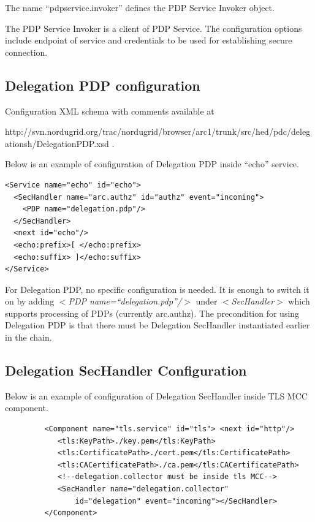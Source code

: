 \documentclass{article}                            %
\begin{document}
The name ``pdpservice.invoker'' defines the PDP Service Invoker object.

The PDP Service Invoker is a client of PDP Service. The configuration options include endpoint of service and credentials to be used for establishing secure connection.


\subsection{Delegation PDP configuration} %
\label{subsec:delegpdp_conf}
Configuration XML schema with comments available at 

http://svn.nordugrid.org/trac/nordugrid/browser/arc1/trunk/src/hed/pdc/delegationsh/DelegationPDP.xsd .

Below is an example of configuration of Delegation PDP inside ``echo'' service.

\begin{verbatim}
<Service name="echo" id="echo">
  <SecHandler name="arc.authz" id="authz" event="incoming">
    <PDP name="delegation.pdp"/>
  </SecHandler>
  <next id="echo"/>
  <echo:prefix>[ </echo:prefix>
  <echo:suffix> ]</echo:suffix>
</Service>
\end{verbatim}

For Delegation PDP, no specific configuration is needed. It is enough to switch it on by adding \textit{$<$PDP name=``delegation.pdp''/$>$} under \textit{$<$SecHandler$>$} which supports processing of PDPs (currently arc.authz).
The precondition for using Delegation PDP is that there must be Delegation SecHandler instantiated earlier in the chain.


\subsection{Delegation SecHandler Configuration} %
\label{subsec:deleg_sechandler_conf}
Below is an example of configuration of Delegation SecHandler inside TLS MCC component.

\begin{verbatim}
         <Component name="tls.service" id="tls"> <next id="http"/>
            <tls:KeyPath>./key.pem</tls:KeyPath>
            <tls:CertificatePath>./cert.pem</tls:CertificatePath>
            <tls:CACertificatePath>./ca.pem</tls:CACertificatePath>
            <!--delegation.collector must be inside tls MCC-->
            <SecHandler name="delegation.collector" 
                id="delegation" event="incoming"></SecHandler>
         </Component>
\end{verbatim}
\end{document}
